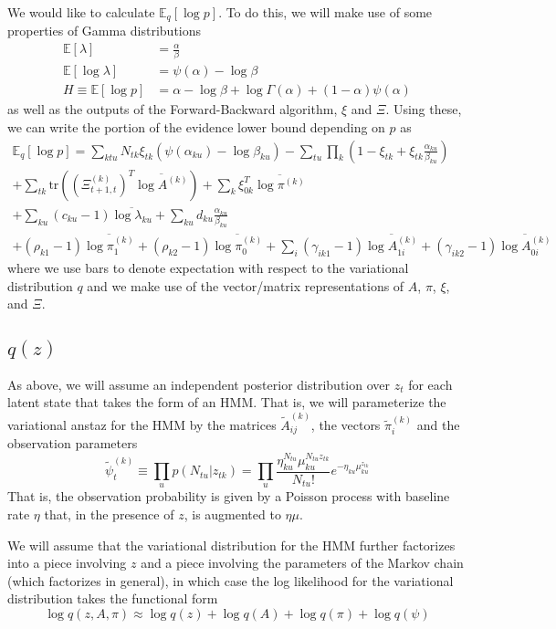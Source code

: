 \documentclass[11pt]{article}
\begin{document}
We would like to calculate $\mathbb{E}_q[\log p]$. To do this, we will make use of some properties of Gamma distributions
\begin{align}
   \mathbb{E}[\lambda] &= \frac{\alpha}{\beta} \\
   \mathbb{E}[\log \lambda] &= \psi(\alpha) - \log \beta \\
   H \equiv \mathbb{E}[\log p] &= \alpha - \log \beta + \log \Gamma(\alpha) + (1 - \alpha)\psi(\alpha) 
\end{align}
as well as the outputs of the Forward-Backward algorithm, $\xi$ and $\Xi$. Using these, we can write the portion of the evidence lower bound depending on $p$ as
\begin{multline}
    \mathbb{E}_q[\log p] = \sum_{ktu} N_{tk}\xi_{tk}(\psi(\alpha_{ku}) -\log \beta_{ku}) - \sum_{tu} \prod_k \left( 1 - \xi_{tk} + \xi_{tk} \frac{\alpha_{ku}}{\beta_{ku}}\right) \\
    + \sum_{tk} \mathrm{tr}\left(\left(\Xi^{(k)}_{t+1, t}\right)^T \overline{\log A^{(k)}} \right) + \sum_{k} \xi^T_{0k} \overline{\log \pi^{(k)}} \\
    + \sum_{ku} (c_{ku} - 1)\overline{\log \lambda_{ku}} + \sum_{ku} d_{ku} \frac{\alpha_{ku}}{\beta_{ku}} \\
    + (\rho_{k1} - 1)\overline{\log \pi_1^{(k)}} + (\rho_{k2} - 1) \overline{\log \pi_0^{(k)}} + \sum_i (\gamma_{ik1} - 1) \overline{\log A_{1i}^{(k)}} + (\gamma_{ik2} - 1) \overline{\log A_{0i}^{(k)}}
\end{multline}
where we use bars to denote expectation with respect to the variational distribution $q$ and we make use of the vector/matrix representations of $A$, $\pi$, $\xi$, and $\Xi$.


\subsection{$q(z)$}
As above, we will assume an independent posterior distribution over $z_t$ for each latent state that takes the form of an HMM. That is, we will parameterize the variational anstaz for the HMM by the matrices $\tilde{A}^{(k)}_{ij}$, the vectors $\tilde{\pi}^{(k)}_i$ and the observation parameters
\begin{equation}
    \tilde{\psi}^{(k)}_t \equiv \prod_u p(N_{tu}|z_{tk}) = \prod_u \frac{\eta_{ku}^{N_{tu}} \mu_{ku}^{N_{tu} z_{tk}}}{N_{tu}!} e^{-\eta_{ku} \mu_{ku}^{z_{tk}}}
\end{equation}
That is, the observation probability is given by a Poisson process with baseline rate $\eta$ that, in the presence of $z$, is augmented to $\eta\mu$.

We will assume that the variational distribution for the HMM further factorizes into a piece involving $z$ and a piece involving the parameters of the Markov chain (which factorizes in general), in which case the log likelihood for the variational distribution takes the functional form
\begin{equation}
    \log q(z, A, \pi) \approx \log q(z) 
    + \log q(A) + \log q(\pi) + \log q(\psi)
\end{equation}
\end{document}
